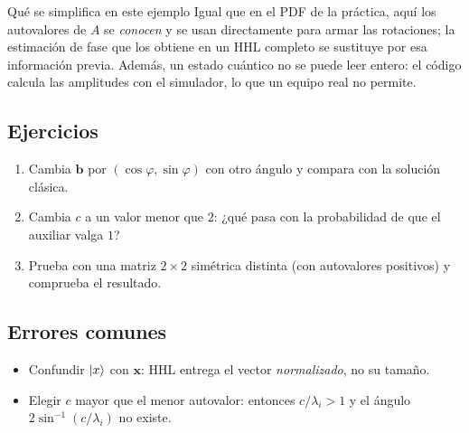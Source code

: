 \begin{nota}{Qué se simplifica en este ejemplo}
Igual que en el PDF de la práctica, aquí los autovalores de $A$ se
\emph{conocen} y se usan directamente para armar las rotaciones; la estimación de
fase que los obtiene en un HHL completo se sustituye por esa información previa.
Además, un estado cuántico no se puede leer entero: el código calcula las
amplitudes con el simulador, lo que un equipo real no permite.
\end{nota}

\subsection{Ejercicios}
\begin{enumerate}
  \item Cambia $\mathbf b$ por $(\cos\varphi,\sin\varphi)$ con otro ángulo y compara
    con la solución clásica.
  \item Cambia $c$ a un valor menor que $2$: ¿qué pasa con la probabilidad de que
    el auxiliar valga $1$?
  \item Prueba con una matriz $2\times2$ simétrica distinta (con autovalores
    positivos) y comprueba el resultado.
\end{enumerate}

\subsection{Errores comunes}
\begin{itemize}
  \item Confundir $\left|x\right\rangle$ con $\mathbf x$: HHL entrega el vector
    \emph{normalizado}, no su tamaño.
  \item Elegir $c$ mayor que el menor autovalor: entonces $c/\lambda_i>1$ y el
    ángulo $2\sin^{-1}(c/\lambda_i)$ no existe.
\end{itemize}


